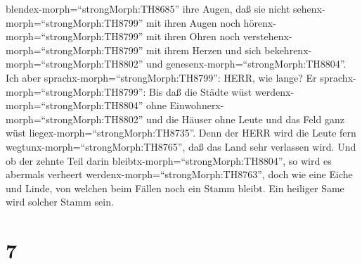 blendex-morph=``strongMorph:TH8685'' ihre Augen, daß sie nicht
sehenx-morph=``strongMorph:TH8799'' mit ihren Augen noch
hörenx-morph=``strongMorph:TH8799'' mit ihren Ohren noch
verstehenx-morph=``strongMorph:TH8799'' mit ihrem Herzen und sich
bekehrenx-morph=``strongMorph:TH8802'' und
genesenx-morph=``strongMorph:TH8804''.  Ich aber
sprachx-morph=``strongMorph:TH8799'': HERR, wie lange? Er
sprachx-morph=``strongMorph:TH8799'': Bis daß die Städte wüst
werdenx-morph=``strongMorph:TH8804'' ohne
Einwohnerx-morph=``strongMorph:TH8802'' und die Häuser ohne Leute und
das Feld ganz wüst liegex-morph=``strongMorph:TH8735''. 
Denn der HERR wird die Leute fern wegtunx-morph=``strongMorph:TH8765'',
daß das Land sehr verlassen wird.  Und ob der zehnte Teil
darin bleibtx-morph=``strongMorph:TH8804'', so wird es abermals verheert
werdenx-morph=``strongMorph:TH8763'', doch wie eine Eiche und Linde, von
welchen beim Fällen noch ein Stamm bleibt. Ein heiliger Same wird
solcher Stamm sein.

\hypertarget{section-6}{%
\section{7}\label{section-6}}

